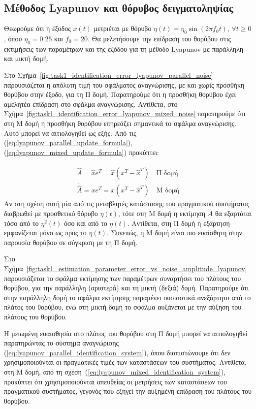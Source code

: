 \documentclass[a4paper,12pt]{article}
\begin{document}
\subsection*{Μέθοδος Lyapunov και θόρυβος δειγματοληψίας}

Θεωρούμε ότι η έξοδος $x(t)$ μετριέται με θόρυβο $\eta(t) = \eta_0 \sin(2\pi f_0 t), \, \forall t \geq 0$, 
όπου $\eta_0 = 0.25$ και $f_0 = 20$. Θα μελετήσουμε την επίδραση του θορύβου στις εκτιμήσεις των παραμέτρων
και της εξόδου για τη μέθοδο Lyapunov με παράλληλη και μικτή
δομή.

Στο Σχήμα~\ref{fig:task1_identification_error_lyapunov_parallel_noise} παρουσιάζεται η απόλυτη τιμή του 
σφάλματος αναγνώρισης, με και χωρίς προσθήκη θορύβου στην έξοδο, για τη Π δομή. Παρατηρούμε ότι η προσθήκη
θορύβου έχει αμελητέα επίδραση στο σφάλμα αναγνώρισης. Αντίθετα, στο 
Σχήμα~\ref{fig:task1_identification_error_lyapunov_mixed_noise} παρατηρούμε ότι στη Μ δομή η προσθήκη θορύβου
επηρεάζει σημαντικά το σφάλμα αναγνώρισης. Αυτό μπορεί να αιτιολογηθεί ως εξής. Από τις
(\ref{eq:lyapunov_parallel_update_formula}), (\ref{eq:lyapunov_mixed_update_formula}) προκύπτει:

\begin{equation*}
    \begin{aligned}
        \dot{\hat{A}} = \hat{x}e^T = \hat{x}(x^T - \hat{x}^T) \quad \text{Π δομή} \\
        \dot{\hat{A}} = xe^T = x(x^T - \hat{x}^T) \quad \text{Μ δομή}
    \end{aligned}
\end{equation*}
Αν στη σχέση αυτή μία από τις μεταβλητές κατάστασης του πραγματικού συστήματος διαβρωθεί με προσθετικό
θόρυβο $\eta(t)$, τότε στη Μ δομή η εκτίμηση $\hat{A}$ θα εξαρτάται τόσο από το $\eta^2(t)$ όσο και από το 
$\eta(t)$. Αντίθετα, στη Π δομή η εξάρτηση εμφανίζεται μόνο ως προς το $\eta(t)$. Συνεπώς, η Μ δομή είναι
πιο ευαίσθητη στην παρουσία θορύβου σε σύγκριση με τη Π δομή.

Στο Σχήμα~\ref{fig:task1_estimation_parameter_error_vs_noise_amplitude_lyapunov} παρουσιάζεται το σφάλμα 
εκτίμησης των παραμέτρων συναρτήσει του πλάτους του θορύβου, για την παράλληλη (αριστερά) και τη μικτή (δεξιά) 
δομή. Παρατηρούμε ότι στην παράλληλη δομή το σφάλμα εκτίμησης παραμένει ουσιαστικά ανεξάρτητο από το πλάτος του
θορύβου, ενώ στη μικτή δομή το σφάλμα αυξάνεται με την αύξηση του πλάτους του θορύβου. 

Η μειωμένη ευαισθησία στο πλάτος του θορύβου στη Π δομή μπορεί να αιτιολογηθεί παρατηρώντας το σύστημα 
αναγνώρισης (\ref{eq:lyapunov_parallel_identification_system}), όπου διαπιστώνουμε ότι δεν 
χρησιμοποιούνται οι πραγματικές τιμές των καταστάσεων του συστήματος. Αντίθετα, στη Μ δομή, από τη 
σχέση~(\ref{eq:lyapunov_mixed_identification_system}), προκύπτει ότι χρησιμοποιούνται απευθείας οι μετρήσεις 
των καταστάσεων του πραγματικού συστήματος, γεγονός που εξηγεί την αυξημένη επίδραση του πλάτους του θορύβου.
\end{document}
